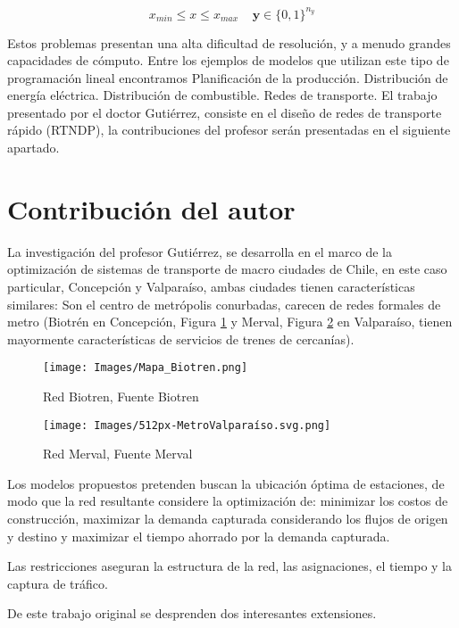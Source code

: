 \documentclass{article}
\begin{document}
\begin{equation}
x_{min}\leq x \leq x_{max} \;\;\;\; \textbf{y}\in \{0,1\}^{n_{y}} 
\end{equation}

Estos problemas presentan una alta dificultad de resolución, y a menudo grandes capacidades de cómputo. Entre los ejemplos de modelos que utilizan este tipo de programación lineal encontramos 
Planificación de la producción.
Distribución de energía eléctrica.
Distribución de combustible.
Redes de transporte.
El trabajo presentado por el doctor Gutiérrez, consiste en el diseño de redes de transporte rápido (RTNDP), la contribuciones del profesor serán presentadas en el siguiente apartado.


\section{Contribución del autor}

La investigación del profesor Gutiérrez, se desarrolla en el marco de la optimización de sistemas de transporte de macro ciudades de Chile, en este caso particular, Concepción y Valparaíso, ambas ciudades tienen características similares: Son el centro de metrópolis conurbadas, carecen de redes formales de metro (Biotrén en Concepción, Figura \ref{Bio} y Merval, Figura \ref{mer} en Valparaíso, tienen mayormente características de servicios de trenes de cercanías).

\begin{figure}[H]
\texttt{[image: Images/Mapa\_Biotren.png]}
\centering
\caption{Red Biotren, Fuente Biotren}
\label{Bio}
\end{figure}

\begin{figure}[H]
\texttt{[image: Images/512px-MetroValparaíso.svg.png]}
\centering
\caption{Red Merval, Fuente Merval}
\label{mer}
\end{figure}

Los modelos propuestos pretenden buscan la ubicación óptima de estaciones, de modo que la red resultante considere la optimización de: minimizar los costos de construcción, maximizar la demanda capturada considerando los flujos de origen y destino y maximizar el tiempo ahorrado por la demanda capturada.

Las restricciones aseguran la estructura de la red, las asignaciones, el tiempo y la captura de tráfico.

De este trabajo original se desprenden dos interesantes extensiones.
\end{document}
